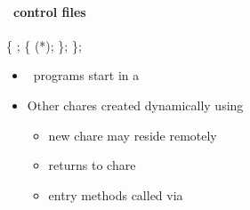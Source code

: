 \begin{frame}[fragile] 
\secframetitle{\ssCharm}
\framesubtitle{\charm\ control files}


 \begin{semiverbatim}
      \{
        ;
         \{
           (*);
       \};
    \};
\end{semiverbatim}
\vspace{-0.2in}
\begin{itemize}
\item \charm\ programs start in a 
\item Other chares created dynamically using 
\begin{itemize}
\item new chare may reside remotely
\item {} returns  to chare
\item entry methods called via 
\end{itemize}

\end{itemize}
\end{frame}
